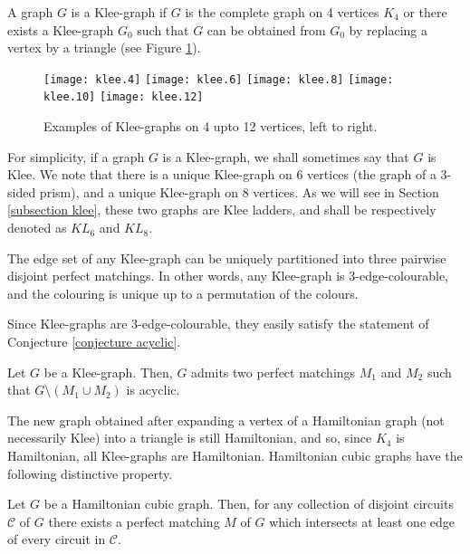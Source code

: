\documentclass[]{theclass}
\begin{document}
\begin{definition}\label{definition klee}
A graph $G$ is a Klee-graph if $G$ is the complete graph on 4 vertices $K_4$ or there exists a Klee-graph $G_0$ such that $G$ can be obtained from $G_0$ by replacing a vertex by a triangle (see Figure \ref{fig:exklee}).
\end{definition}

\begin{figure}[ht]
    \centering
    \texttt{[image: klee.4]}
    \texttt{[image: klee.6]}
    \texttt{[image: klee.8]}
    \texttt{[image: klee.10]}
    \texttt{[image: klee.12]}
    \caption{Examples of Klee-graphs on 4 upto 12 vertices, left to right.}
    \label{fig:exklee}
\end{figure}
For simplicity, if a graph $G$ is a Klee-graph, we shall sometimes say that $G$ is Klee. We note that there is a unique Klee-graph on 6 vertices (the graph of a 3-sided prism), and a unique Klee-graph on 8 vertices. As we will see in Section \ref{subsection klee}, these two graphs are Klee ladders, and shall be respectively denoted as $KL_6$ and $KL_8$. 

\begin{lemma}
The edge set of any Klee-graph can be uniquely partitioned into three pairwise
disjoint perfect matchings. In other words, any Klee-graph is 3-edge-colourable, and the colouring is unique up to a permutation of the colours.
\end{lemma}

Since Klee-graphs are 3-edge-colourable, they easily satisfy the statement of Conjecture \ref{conjecture acyclic}.

\begin{proposition}\label{prop klee}
Let $G$ be a Klee-graph. Then, $G$ admits two perfect matchings $M_1$ and $M_2$ such that $G\setminus (M_1\cup M_2)$ is acyclic.
\end{proposition}

The new graph obtained after expanding a vertex of a Hamiltonian graph (not necessarily Klee) into a triangle is still Hamiltonian, and so, since $K_4$ is Hamiltonian, all Klee-graphs are Hamiltonian. Hamiltonian cubic graphs have the following distinctive property.

\begin{proposition}\label{prop ham collection}
Let $G$ be a Hamiltonian cubic graph. Then, for any collection of disjoint circuits $\mathcal{C}$ of $G$ there exists a perfect matching $M$ of $G$ which intersects at least one edge of every circuit in $\mathcal{C}$.
\end{proposition}
\end{document}
